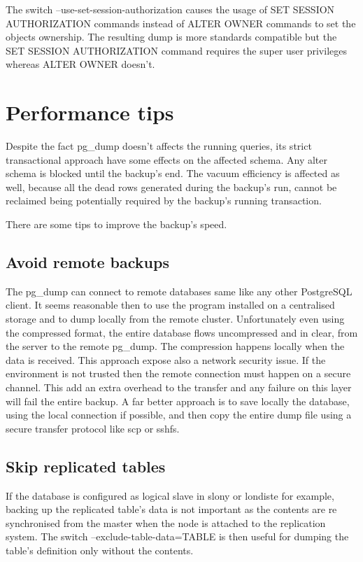 The switch --use-set-session-authorization causes the usage of SET SESSION AUTHORIZATION 
commands instead of ALTER OWNER commands to set the objects ownership. The resulting dump is more 
standards compatible but the SET SESSION AUTHORIZATION command requires the super user privileges 
whereas ALTER OWNER doesn't.


\section{Performance tips}
Despite the fact pg\_dump doesn't affects the running queries, its strict transactional approach 
have some effects on the affected schema. Any alter schema is blocked until the backup's end. The 
vacuum efficiency is affected as well, because all the dead rows generated during the backup's run, 
cannot be reclaimed being potentially required by the backup's running transaction.\newline

There are some tips to improve the backup's speed.

\subsection{Avoid remote backups}
The pg\_dump can connect to remote databases same like any other PostgreSQL client.
It seems reasonable then to use the program installed on a centralised storage and to dump locally 
from the remote cluster.\newline 
Unfortunately even using the compressed format, the entire database flows uncompressed and in 
clear, from the server to the remote pg\_dump. The compression happens locally when the data is 
received.\newline
This approach expose also a network security issue. If the environment is not trusted then the 
remote connection must happen on a secure channel. This add an extra overhead to the transfer and 
any failure on this layer will fail the entire backup.\newline
A far better approach is to save locally the database, using the local connection if possible, and 
then copy the entire dump file using a secure transfer protocol like scp or sshfs.

\subsection{Skip replicated tables}
If the database is configured as logical slave in slony or londiste for example, backing up the 
replicated table's data is not important as the contents are re synchronised from the master when 
the node is attached to the replication system. The switch --exclude-table-data=TABLE is then 
useful for dumping the table's definition only without the contents.

